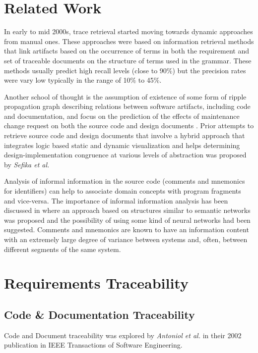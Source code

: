 \documentclass{report}
\begin{document}
\section{Related Work}
\label{sec:relatedWork}
In early to mid 2000s, trace retrieval started moving towards dynamic approaches from manual ones\cite{antoniol02, hayes03, hayes94, settimi04}. These approaches were based on information retrieval methods that link artifacts based on the occurrence of terms in both the requirement and set of traceable documents on the structure of terms used in the grammar. These methods usually predict high recall levels (close to 90\%) but the precision rates were vary low typically in the range of 10\% to 45\%.

Another school of thought is the assumption of existence of some form of ripple propagation graph describing relations between software artifacts, including code and documentation, and focus on the prediction of the effects of maintenance change request on both the source code and design documents \cite{arnold93, fyson98}. Prior attempts to retrieve source code and design documents that involve a hybrid approach that integrates logic based static and dynamic visualization and helps determining design-implementation congruence at various levels of abstraction was proposed by \textit{Sefika et al.} \cite{sefika96}

Analysis of informal information in the source code (comments and mnemonics for identifiers) can help to associate domain concepts with program fragments and vice-versa. The importance of informal information analysis has been discussed in \cite{biggerstaff89} where an approach based on structures similar to semantic networks was proposed and the possibility of using some kind of neural networks had been suggested. Comments and mnemonics are known to have an information content with an extremely large degree of variance between systems and, often, between different segments of the same system.

\section{Requirements Traceability}
\subsection{Code \& Documentation Traceability}
\label{sec:codeAndDoc}

Code and Document traceability was explored by \textit{Antoniol et al.} \cite{antoniol02} in their 2002
publication in IEEE Transactions of Software Engineering.
\end{document}
